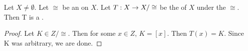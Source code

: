 \begin{prop}
\label{prop:QuotientMapSurjective}
\rm
    Let $X \neq \emptyset$. 
    Let $\cong$ be an 
	\EquivalenceRelation on 
	$X$.
    Let $T : X\to X/\cong$  be the 
	\QuotientMap of $X$ under the 
	\Relation
	$\cong$. 
    Then T is a 
	\Surjection. 
    \begin{proof}
       Let $K \in Z/\cong$. 
       Then for some $x \in Z$, $K=[x]$. 
       Then $T(x) = K$. 
       Since K was arbitrary, we are done. 
    \end{proof}
\end{prop} 
